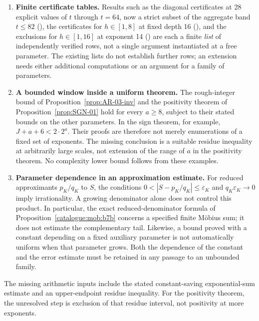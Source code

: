 \begin{enumerate}[leftmargin=*]
\item \textbf{Finite certificate tables.} Results such as the
diagonal certificates at 28 explicit values of $t$ through $t{=}64$, now a
strict subset of the aggregate band $t\le82$
(),
the certificates for $h\in[1,8]$ at fixed depth 16
(), and the
exclusions for $h\in[1,16]$ at exponent 14
()
are each a finite \emph{list} of independently verified rows, not a
single argument instantiated at a free parameter. The existing lists do not
establish further rows; an extension needs either additional computations
or an argument for a family of parameters.
\item \textbf{A bounded window inside a uniform theorem.} The rough-integer
bound of Proposition~\ref{prop:AR-03-inv} and the positivity theorem of
Proposition~\ref{prop:SGN-01}
hold for every $a\ge8$, subject to their stated bounds on the other
parameters. In the sign theorem, for example, $J+a+6<2\cdot2^a$.
Their proofs are therefore not merely enumerations of a fixed set of
exponents. The missing conclusion is a suitable residue inequality at
arbitrarily large scales, not extension of the range of $a$ in the
positivity theorem. No complexity lower bound follows from these examples.
\item \textbf{Parameter dependence in an approximation estimate.}
For reduced approximants $p_K/q_K$ to $S$, the conditions
$0<|S-p_K/q_K|\le\varepsilon_K$ and
$q_K\varepsilon_K\to0$ imply irrationality. A growing denominator
alone does not control this product. In particular, the exact
reduced-denominator formula of Proposition~\ref{catalogue:mob:b7b}
concerns a specified finite M\"obius sum; it does not estimate the
complementary tail. Likewise, a bound proved with a constant depending
on a fixed auxiliary parameter is not automatically uniform when that
parameter grows. Both the dependence of the constant and the error
estimate must be retained in any passage to an unbounded family.
\end{enumerate}

The missing arithmetic inputs include the stated constant-saving
exponential-sum estimate and an upper-endpoint residue inequality.
For the positivity theorem, the unresolved step is exclusion of that
residue interval, not positivity at more exponents.

